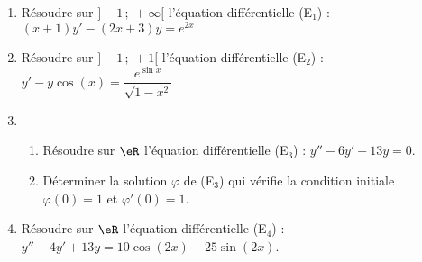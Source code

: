 
\begin{exercice}\label{exoautoanalyseCTU-49}

\begin{enumerate}
\item  Résoudre sur $]-1\,;\,+\infty[$ l'équation différentielle (E$_{1}$) : $(x+1)y'-(2x+3)y=e^{2x}$
\item Résoudre sur $]-1\,;\,+1[$ l'équation différentielle (E$_{2}$) : $y'-y\cos(x)=\dfrac{e^{\sin x}}{\sqrt{1-x^2}}$
\item  \begin{enumerate}
\item Résoudre sur $\eR$ l'équation différentielle (E$_{3}$) : $y''-6y'+13y=0$. 
\item Déterminer la solution $\varphi$ de (E$_{3}$) qui vérifie la condition initiale $\varphi(0)=1$ et $\varphi'(0)=1$.
\end{enumerate}
\item  Résoudre sur $\eR$ l'équation différentielle (E$_{4}$) : $y''-4y'+13y=10\cos(2x)+25\sin(2x)$. 
\end{enumerate}

\end{exercice}
